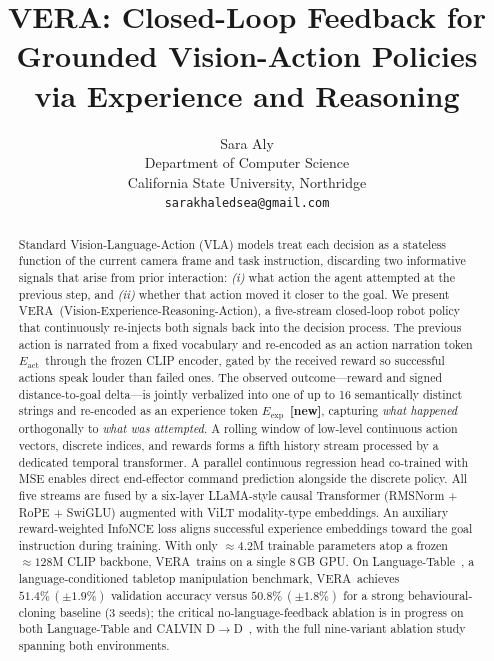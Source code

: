 \documentclass{article}
\title{\textbf{VERA}: Closed-Loop Feedback for\\
       Grounded Vision-Action Policies via Experience and Reasoning}
\author{Sara Aly \\
  Department of Computer Science \\
  California State University, Northridge \\
  \texttt{sarakhaledsea@gmail.com}}
\newcommand{\modelname}{\textsc{VERA}\xspace}
\newcommand{\Lact}{$E_{\mathrm{act}}$\xspace}
\newcommand{\Lexp}{$E_{\mathrm{exp}}$\xspace}
\newcommand{\NEW}{\textcolor{NewOrange}{\textbf{[new]}}\xspace}
\begin{document}
\maketitle

\begin{abstract}
Standard Vision-Language-Action (VLA) models treat each decision as a
stateless function of the current camera frame and task instruction,
discarding two informative signals that arise from prior interaction:
\emph{(i)} what action the agent attempted at the previous step, and
\emph{(ii)} whether that action moved it closer to the goal.
We present \modelname\ (Vision-Experience-Reasoning-Action), a
five-stream closed-loop robot policy that continuously re-injects both
signals back into the decision process.
The previous action is narrated from a fixed vocabulary and
re-encoded as an action narration token \Lact\ through the frozen CLIP
encoder, gated by the received reward so successful actions speak
louder than failed ones.
The observed outcome---reward and signed distance-to-goal delta---is
jointly verbalized into one of up to 16 semantically distinct strings
and re-encoded as an experience token \Lexp\ \NEW, capturing
\emph{what happened} orthogonally to \emph{what was attempted}.
A rolling window of low-level continuous action vectors, discrete
indices, and rewards forms a fifth history stream processed by a
dedicated temporal transformer.
A parallel continuous regression head co-trained with MSE enables
direct end-effector command prediction alongside the discrete policy.
All five streams are fused by a six-layer LLaMA-style causal
Transformer (RMSNorm + RoPE + SwiGLU) augmented with ViLT
modality-type embeddings.
An auxiliary reward-weighted InfoNCE loss aligns successful experience
embeddings toward the goal instruction during training.
With only $\approx\!4.2$M trainable parameters atop a frozen
$\approx\!128$M CLIP backbone, \modelname\ trains on a single 8\,GB GPU.
On Language-Table~\citep{lynch2023languagetable}, a language-conditioned
tabletop manipulation benchmark, \modelname\ achieves
$51.4\%\,(\pm1.9\%)$ validation accuracy versus $50.8\%\,(\pm1.8\%)$
for a strong behavioural-cloning baseline (3 seeds);
the critical no-language-feedback ablation is in progress on both
Language-Table and CALVIN D$\to$D~\citep{mees2022calvin}, with the
full nine-variant ablation study spanning both environments.
\end{abstract}

\end{document}
